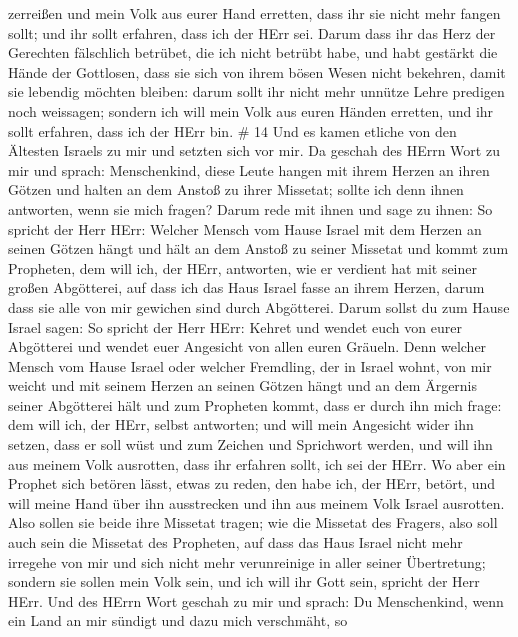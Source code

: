 zerreißen und mein Volk aus eurer Hand erretten, dass ihr sie nicht mehr
fangen sollt; und ihr sollt erfahren, dass ich der HErr sei.
 Darum dass ihr das Herz der Gerechten fälschlich betrübet,
die ich nicht betrübt habe, und habt gestärkt die Hände der Gottlosen,
dass sie sich von ihrem bösen Wesen nicht bekehren, damit sie lebendig
möchten bleiben:  darum sollt ihr nicht mehr unnütze Lehre
predigen noch weissagen; sondern ich will mein Volk aus euren Händen
erretten, und ihr sollt erfahren, dass ich der HErr bin. \# 14
 Und es kamen etliche von den Ältesten Israels zu mir und
setzten sich vor mir.  Da geschah des HErrn Wort zu mir und
sprach:  Menschenkind, diese Leute hangen mit ihrem Herzen
an ihren Götzen und halten an dem Anstoß zu ihrer Missetat; sollte ich
denn ihnen antworten, wenn sie mich fragen?  Darum rede mit
ihnen und sage zu ihnen: So spricht der Herr HErr: Welcher Mensch vom
Hause Israel mit dem Herzen an seinen Götzen hängt und hält an dem
Anstoß zu seiner Missetat und kommt zum Propheten, dem will ich, der
HErr, antworten, wie er verdient hat mit seiner großen Abgötterei,
 auf dass ich das Haus Israel fasse an ihrem Herzen, darum
dass sie alle von mir gewichen sind durch Abgötterei.  Darum
sollst du zum Hause Israel sagen: So spricht der Herr HErr: Kehret und
wendet euch von eurer Abgötterei und wendet euer Angesicht von allen
euren Gräueln.  Denn welcher Mensch vom Hause Israel oder
welcher Fremdling, der in Israel wohnt, von mir weicht und mit seinem
Herzen an seinen Götzen hängt und an dem Ärgernis seiner Abgötterei hält
und zum Propheten kommt, dass er durch ihn mich frage: dem will ich, der
HErr, selbst antworten;  und will mein Angesicht wider ihn
setzen, dass er soll wüst und zum Zeichen und Sprichwort werden, und
will ihn aus meinem Volk ausrotten, dass ihr erfahren sollt, ich sei der
HErr.  Wo aber ein Prophet sich betören lässt, etwas zu
reden, den habe ich, der HErr, betört, und will meine Hand über ihn
ausstrecken und ihn aus meinem Volk Israel ausrotten.  Also
sollen sie beide ihre Missetat tragen; wie die Missetat des Fragers,
also soll auch sein die Missetat des Propheten,  auf dass
das Haus Israel nicht mehr irregehe von mir und sich nicht mehr
verunreinige in aller seiner Übertretung; sondern sie sollen mein Volk
sein, und ich will ihr Gott sein, spricht der Herr HErr. 
Und des HErrn Wort geschah zu mir und sprach:  Du
Menschenkind, wenn ein Land an mir sündigt und dazu mich verschmäht, so
